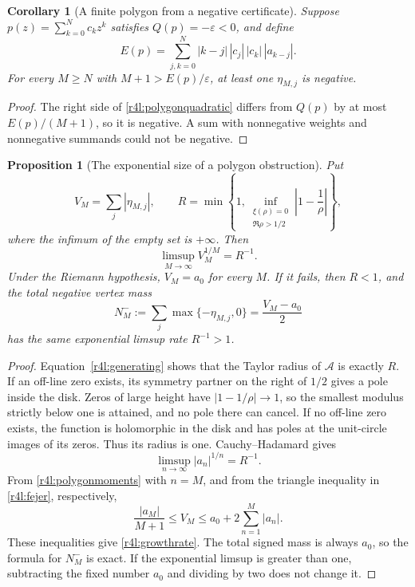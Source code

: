 \documentclass[11pt,a4paper]{article}
\newtheorem{proposition}[theorem]{Proposition}
\newtheorem{corollary}[theorem]{Corollary}
\theoremstyle{definition}\newtheorem{definition}[theorem]{Definition}
\theoremstyle{remark}\newtheorem{remark}[theorem]{Remark}
\numberwithin{equation}{section}
\begin{document}
\begin{corollary}[A finite polygon from a negative certificate]
\label{r4l:negativepolygon}
Suppose $p(z)=\sum_{k=0}^Nc_kz^k$ satisfies $Q(p)=-\varepsilon<0$,
and define
\[
 E(p)=\sum_{j,k=0}^N|k-j|\,|c_j|\,|c_k|\,|a_{k-j}|.
\]
For every $M\ge N$ with $M+1>E(p)/\varepsilon$, at least one
$\eta_{M,j}$ is negative.
\end{corollary}
\begin{proof}
The right side of \eqref{r4l:polygonquadratic} differs from $Q(p)$
by at most $E(p)/(M+1)$, so it is negative.  A sum with nonnegative
weights and nonnegative summands could not be negative.
\end{proof}

\begin{proposition}[The exponential size of a polygon obstruction]
\label{r4l:polygongrowth}
Put
\[
 V_M=\sum_j|\eta_{M,j}|,
 \qquad
 R=\min\left\{1,
       \inf_{\substack{\xi(\rho)=0\\\Re\rho>1/2}}
                \left|1-\frac1\rho\right|\right\},
\]
where the infimum of the empty set is $+\infty$.  Then
\begin{equation}\label{r4l:growthrate}
 \limsup_{M\to\infty}V_M^{1/M}=R^{-1}.
\end{equation}
Under the Riemann hypothesis, $V_M=a_0$ for every $M$.  If it fails,
then $R<1$, and the total negative vertex mass
\[
 N_M^-:=\sum_j\max\{-\eta_{M,j},0\}
       =\frac{V_M-a_0}{2}
\]
has the same exponential limsup rate $R^{-1}>1$.
\end{proposition}
\begin{proof}
Equation~\eqref{r4l:generating} shows that the Taylor radius of
$\mathcal A$ is exactly $R$.  If an off-line zero exists, its symmetry
partner on the right of $1/2$ gives a pole inside the disk.  Zeros of
large height have $|1-1/\rho|\to1$, so the smallest modulus strictly
below one is attained, and no pole there can cancel.  If no off-line
zero exists, the function is holomorphic in the disk and has poles
at the unit-circle images of its zeros.  Thus its radius is one.
Cauchy--Hadamard gives
\[
 \limsup_{n\to\infty}|a_n|^{1/n}=R^{-1}.
\]
From \eqref{r4l:polygonmoments} with $n=M$, and from the triangle
inequality in \eqref{r4l:fejer}, respectively,
\[
 \frac{|a_M|}{M+1}\le V_M
 \le a_0+2\sum_{n=1}^M|a_n|.
\]
These inequalities give \eqref{r4l:growthrate}.  The total signed
mass is always $a_0$, so the formula for $N_M^-$ is exact.  If the
exponential limsup is greater than one, subtracting the fixed number
$a_0$ and dividing by two does not change it.
\end{proof}
\end{document}
